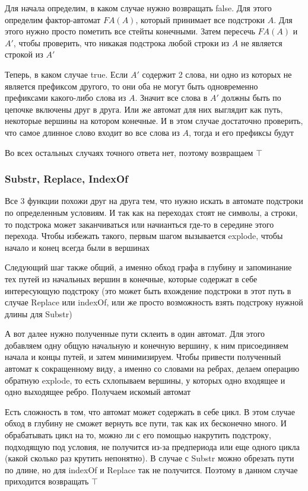 Для начала определим, в каком случае нужно возвращать false. Для этого определим фактор-автомат $FA(A)$, который принимает все подстроки $A$. Для этого нужно просто пометить все стейты конечными. Затем пересечь $FA(A)$ и $A'$, чтобы проверить, что никакая подстрока любой строки из $A$ не является строкой из $A'$

Теперь, в каком случае true. Если $A'$ содержит 2 слова, ни одно из которых не является префиксом другого, то они оба не могут быть одновременно префиксами какого-либо слова из $A$. Значит все слова в $A'$ должны быть по цепочке включены друг в друга. Или же автомат для них выглядит как путь, некоторые вершины на котором конечные. И в этом случае достаточно проверить, что самое длинное слово входит во все слова из $A$, тогда и его префиксы будут

Во всех остальных случаях точного ответа нет, поэтому возвращаем $\top$

\newpage
\subsubsection*{Substr, Replace, IndexOf}
Все 3 функции похожи друг на друга тем, что нужно искать в автомате подстроки по определенным условиям. И так как на переходах стоят не символы, а строки, то подстрока может заканчиваться или начианться где-то в середине этого перехода. Чтобы избежать такого, первым шагом вызывается explode, чтобы начало и конец всегда были в вершинах

Следующий шаг также общий, а именно обход графа в глубину и запоминание тех путей из начальных вершин в конечные, которые содержат в себе интересующую подстроку (это может быть вхождение подстроки в этот путь в случае Replace или indexOf, или же просто возможность взять подстроку нужной длины для Substr)

А вот далее нужно полученные пути склеить в один автомат. Для этого добавляем одну общую начальную и конечную вершину, к ним присоединяем начала и концы путей, и затем минимизируем. Чтобы привести полученный автомат к сокращенному виду, а именно со словами на ребрах, делаем операцию обратную explode, то есть схлопываем вершины, у которых одно входящее и одно выходящее ребро. Получаем искомый автомат

Есть сложность в том, что автомат может содержать в себе цикл. В этом случае обход в глубину не сможет вернуть все пути, так как их бесконечно много. И обрабатывать цикл на то, можно ли с его помощью накрутить подстроку, подходящую под условия, не получится из-за предпериода или еще одного цикла (какой сколько раз крутить непонятно). В случае с Substr можно обрезать пути по длине, но для indexOf и Replace так не получится. Поэтому в данном случае приходится возвращать $\top$

